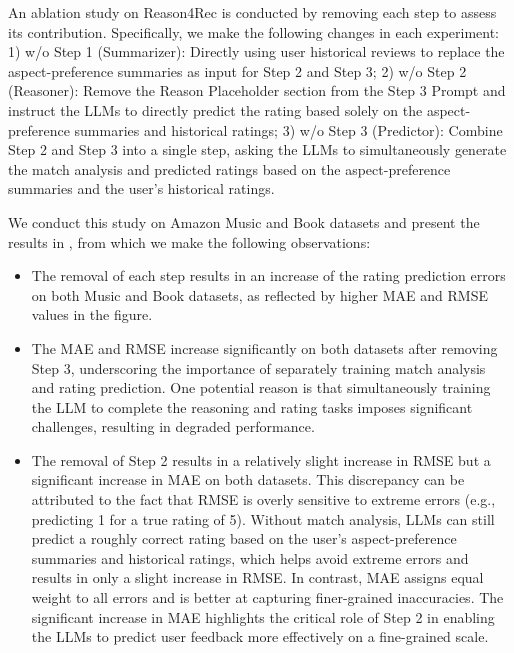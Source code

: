 An ablation study on Reason4Rec is conducted by removing each step to assess its contribution. 
Specifically, we make the following changes in each experiment: 1) w/o Step 1 (\ie Summarizer): Directly using user historical reviews to replace the aspect-preference summaries as input for Step 2 and Step 3;  2) w/o Step 2 (\ie Reasoner): Remove the Reason Placeholder section from the Step 3 Prompt and instruct the LLMs to directly predict the rating based solely on the aspect-preference summaries and historical ratings; 3) w/o Step 3 (\ie Predictor): Combine Step 2 and Step 3 into a single step, asking the LLMs to simultaneously generate the match analysis and predicted ratings based on the aspect-preference summaries and the user's historical ratings.


We conduct this study on Amazon Music and Book datasets and present the results in , from which we make the following observations:
\begin{itemize}[leftmargin=*]
    \item The removal of each step results in an increase of the rating prediction errors on both Music and Book datasets, as reflected by higher MAE and RMSE values in the figure. 

    \item The MAE and RMSE increase significantly on both datasets after removing Step 3, underscoring the importance of separately training match analysis and rating prediction. One potential reason is that simultaneously training the LLM to complete the reasoning and rating tasks imposes significant challenges, resulting in degraded performance.

    \item The removal of Step 2 results in a relatively slight increase in RMSE but a significant increase in MAE on both datasets. 
    This discrepancy can be attributed to the fact that RMSE is overly sensitive to extreme errors (e.g., predicting 1 for a true rating of 5). Without match analysis, LLMs can still predict a roughly correct rating based on the user's aspect-preference summaries and historical ratings, which helps avoid extreme errors and results in only a slight increase in RMSE. In contrast, MAE assigns equal weight to all errors and is better at capturing finer-grained inaccuracies. The significant increase in MAE highlights the critical role of Step 2 in enabling the LLMs to predict user feedback more effectively on a fine-grained scale.

\end{itemize}



